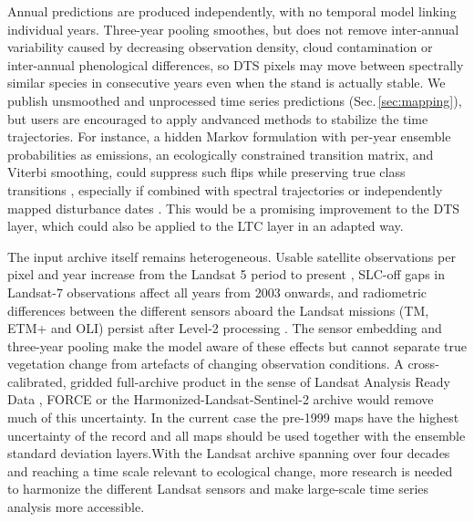 \documentclass[essd, manuscript]{copernicus}
\begin{document}
Annual predictions are produced independently, with no temporal model linking individual years. Three-year pooling smoothes, but does not remove inter-annual variability caused by decreasing observation density, cloud contamination or inter-annual phenological differences, so DTS pixels may move between spectrally similar species in consecutive years even when the stand is actually stable. We publish unsmoothed and unprocessed time series predictions (Sec.\,\ref{sec:mapping}), but users are encouraged to apply andvanced methods to stabilize the time trajectories. For instance, a hidden Markov formulation with per-year ensemble probabilities as emissions, an ecologically constrained transition matrix, and Viterbi smoothing, could suppress such flips while preserving true class transitions \citep{abercrombie_improving_2016, hermosilla_disturbance-informed_2018}, especially if combined with spectral trajectories \citep{kennedy_detecting_2010, zhu_continuous_2014} or independently mapped disturbance dates \citep{viana-soto_european_2025}. This would be a promising improvement to the DTS layer, which could also be applied to the LTC layer in an adapted way.

The input archive itself remains heterogeneous. Usable satellite observations per pixel and year increase from the Landsat 5 period to present \citep{white_pixel-based_2014,bayle_landsat-based_2024}, SLC-off gaps in Landsat-7 observations affect all years from 2003 onwards, and radiometric differences between the different sensors aboard the Landsat missions (TM, ETM+ and OLI) persist after Level-2 processing \citep{roy_characterization_2016}. The sensor embedding and three-year pooling make the model aware of these effects but cannot separate true vegetation change from artefacts of changing observation conditions. A cross-calibrated, gridded full-archive product in the sense of Landsat Analysis Ready Data \citep{dwyer_analysis_2018}, FORCE \citep{frantz_force_2019} or the Harmonized-Landsat-Sentinel-2 archive \citep{claverie_harmonized_2018} would remove much of this uncertainty. In the current case the pre-1999 maps have the highest uncertainty of the record and all maps should be used together with the ensemble standard deviation layers.With the Landsat archive spanning over four decades and reaching a time scale relevant to ecological change, more research is needed to harmonize the different Landsat sensors and make large-scale time series analysis more accessible.
\end{document}
